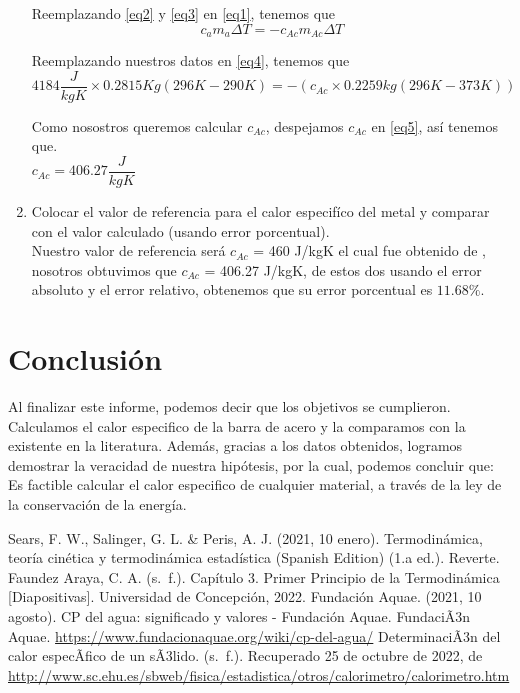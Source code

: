 \documentclass[a4paper, 12p]{article}
\begin{document}
\begin{enumerate}
                    Reemplazando \ref{eq2} y \ref{eq3} en \ref{eq1}, tenemos que 
                    \begin{equation}\label{eq4}
                    c_{a} m_{a} \Delta T = -c_{Ac} m_{Ac} \Delta T
                    \end{equation}
                    
                    Reemplazando nuestros datos en \ref{eq4}, tenemos que 
                    \begin{equation}\label{eq5}
                    4184 \dfrac{J}{kgK} \times 0.2815Kg(296K - 290K) = -(c_{Ac} \times 0.2259kg(296K - 373K))
                    \end{equation}
                    
                    Como nosostros queremos calcular $c_{Ac}$, despejamos $c_{Ac}$ en \ref{eq5}, así tenemos que.\\
                    $c_{Ac} = 406.27 \dfrac{J}{kgK}$  		    
                      
      \item Colocar el valor de referencia para el calor especifíco del metal y comparar con el valor calculado (usando error porcentual).\\
      Nuestro valor de referencia será $c_{Ac}$ = 460 J/kgK el cual fue obtenido de \cite{acero}, nosotros obtuvimos que $c_{Ac}$ = 406.27 J/kgK, de estos dos usando el error absoluto y el error relativo, obtenemos que su error porcentual es $11.68\%$. 
      
      
    \end{enumerate}   


\section{Conclusión}
Al finalizar este informe, podemos decir que los objetivos se cumplieron. Calculamos el calor especifico de la barra de acero y la comparamos con la existente en la literatura.
Además, gracias a los datos obtenidos, logramos demostrar la veracidad de nuestra hipótesis, por la cual, podemos concluir que: \\
Es factible calcular el calor especifico de cualquier material, a través de la ley de la conservación de la energía.




\begin{thebibliography}{6}
       Sears, F. W., Salinger, G. L. \& Peris, A. J. (2021, 10 enero). Termodinámica, teoría cinética y termodinámica estadística (Spanish Edition) (1.a ed.). Reverte.
       Faundez Araya, C. A. (s. f.). Capítulo 3. Primer Principio de la Termodinámica [Diapositivas]. Universidad de Concepción, 2022.
      Fundación Aquae. (2021, 10 agosto). CP del agua: significado y valores - Fundación Aquae. FundaciÃ3n Aquae. 
      \url{https://www.fundacionaquae.org/wiki/cp-del-agua/}
      DeterminaciÃ3n del calor especÃ­fico de un sÃ3lido. (s. f.). Recuperado 25 de octubre de 2022,
       de \url{http://www.sc.ehu.es/sbweb/fisica/estadistica/otros/calorimetro/calorimetro.htm}
\end{thebibliography}
\end{document}
